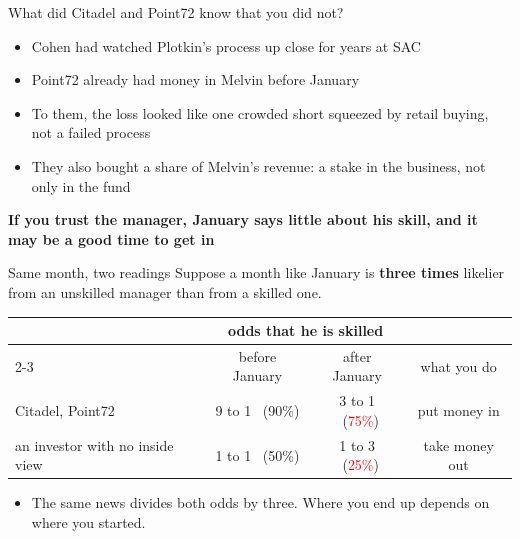 \documentclass[aspectratio=169,10pt]{beamer}
\begin{document}
\begin{frame}{What did Citadel and Point72 know that you did not?}
\begin{itemize}
\item Cohen had watched Plotkin's process up close for years at SAC
\vskip 10pt
\item Point72 already had money in Melvin before January
\vskip 10pt
\item To them, the loss looked like one crowded short squeezed by retail buying, not a failed process
\vskip 10pt
\item They also bought a share of Melvin's revenue: a stake in the business, not only in the fund
\end{itemize}
\vskip 10pt
\begin{center}
\textbf{If you trust the manager, January says little about his skill, and it may be a good time to get in}
\end{center}
\end{frame}

\begin{frame}[label=melvinodds]{Same month, two readings}
Suppose a month like January is \textbf{three times} likelier from an unskilled manager than from a skilled one.
\vskip 6pt
\begin{center}
\renewcommand{\arraystretch}{1.5}
\begin{tabular}{lccc}
\toprule
 & \multicolumn{2}{c}{odds that he is skilled} & \\
\cmidrule(lr){2-3}
 & before January & after January & what you do \\
\midrule
Citadel, Point72 & 9 to 1 \ (90\%) & 3 to 1 \ (\textcolor{red}{75\%}) & put money in \\
an investor with no inside view & 1 to 1 \ (50\%) & 1 to 3 \ (\textcolor{red}{25\%}) & take money out \\
\bottomrule
\end{tabular}
\end{center}
\vskip 6pt
\begin{itemize}
\item The same news divides both odds by three. Where you end up depends on where you started.
\hfill \hyperlink{bayes}{}
\end{itemize}
\end{frame}
\end{document}
